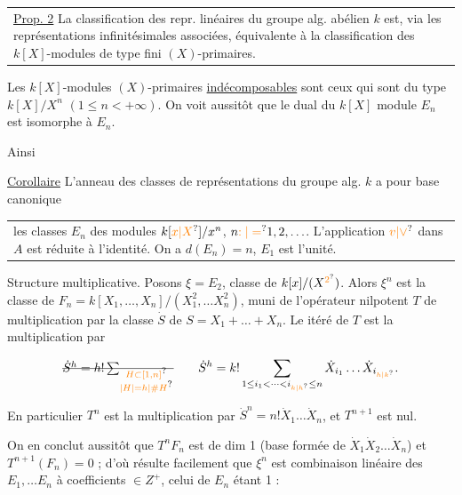 \noindent\begin{tabular}{@{}|p{.92\linewidth}@{}}\uline{Prop. 2} La classification des repr. linéaires du groupe alg. abélien $k$ est, via les représentations infinitésimales associées, équivalente à la classification des $k[X]$-modules de type fini $(X)$-primaires.\end{tabular}


Les $k[X]$-modules $(X)$-primaires \uline{indécomposables} sont ceux qui sont du type $k[X]/X^{n}$ $(1\leq n<+\infty)$. On  voit aussitôt que le dual  du $k[X]$ module $E_n$ est isomorphe à $E_n$.


Ainsi

\uline{Corollaire} L'anneau  des classes de représentations du groupe alg. $k$ a pour base canonique



\noindent\begin{tabular}{@{}|p{.92\linewidth}@{}}les classes $E_n$ des modules $k[\unsure{x|X}]/x^n$, $n\unsure{:|=}1,2,\ldots$. L'application $\unsure{v|\vee}$ dans $A$ est réduite à l'identité. On a $d(E_n)=n$, $E_1$ est l'unité.\end{tabular}

Structure multiplicative. Posons $\xi=E_2$, classe de $k[x]/(X^{\unsure{2}})$. Alors $\xi^n$ est la classe de $F_n=k[X_1,\ldots,X_n]/(X_1^2,\ldots X_n^2)$, muni de l'opérateur nilpotent $T$ de multiplication par la classe $\dot S$ de $S=X_1+\ldots+X_n$.  Le  itéré  de $T$ est la multiplication par

\[ \deleted{\dot S^h=h!\sum_{\substack{\unsure{H\subset[1,n]}\\\unsure{\lvert H\rvert=h|\#H}}}}\qquad \dot S^h=k!\sum_{1\leq i_1<\cdots<i_{\unsure{k|h}}\leq n}\dot X_{i_1}\ldots\dot X_{i_{\unsure{h|k}}}. \]

En particulier $T^n$ est la multiplication par $\dot S^n=n!\dot X_1\ldots\dot X_n$, et $T^{n+1}$ est nul.

On en conclut aussitôt que $T^n F_n$ est de dim 1 (base formée de $\dot X_1\dot X_2\ldots\dot X_n$) et $T^{n+1}(F_n)=0$ ; d'où résulte facilement que  $\xi^n$ est combinaison linéaire des $E_1,\ldots E_n$ à coefficients $\in Z^+$, celui de $E_n$ étant 1 :

